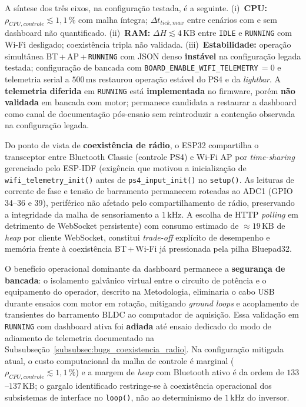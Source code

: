 A síntese dos três eixos, na configuração testada, é a seguinte. (i)~\textbf{CPU:} $\rho_{CPU,controle} \lesssim 1{,}1\,\%$ com malha íntegra; $\Delta t_{tick,max}$ entre cenários com e sem dashboard não quantificado. (ii)~\textbf{RAM:} $\Delta H \lesssim 4\,\text{KB}$ entre \texttt{IDLE} e \texttt{RUNNING} com Wi-Fi desligado; coexistência tripla não validada. (iii)~\textbf{Estabilidade:} operação simultânea BT\,+\,AP\,+\,\texttt{RUNNING} com JSON denso \textbf{instável} na configuração legada testada; configuração de bancada com \texttt{BOARD\_ENABLE\_WIFI\_TELEMETRY}\,$= 0$ e telemetria serial a $500\,\text{ms}$ restaurou operação estável do PS4 e da \textit{lightbar}. A \textbf{telemetria diferida} em \texttt{RUNNING} está \textbf{implementada} no firmware, porém \textbf{não validada} em bancada com motor; permanece candidata a restaurar a dashboard como canal de documentação pós-ensaio sem reintroduzir a contenção observada na configuração legada.

Do ponto de vista de \textbf{coexistência de rádio}, o ESP32 compartilha o transceptor entre Bluetooth Classic (controle PS4) e Wi-Fi AP por \textit{time-sharing} gerenciado pelo ESP-IDF (exigência que motivou a inicialização de \texttt{wifi\_telemetry\_init()} antes de \texttt{ps4\_input\_init()} no \texttt{setup()}. As leituras de corrente de fase e tensão de barramento permanecem roteadas ao ADC1 (GPIO 34--36 e 39), periférico não afetado pelo compartilhamento de rádio, preservando a integridade da malha de sensoriamento a $1\,\text{kHz}$. A escolha de HTTP \textit{polling} em detrimento de WebSocket persistente) com consumo estimado de $\approx 19\,\text{KB}$ de \textit{heap} por cliente WebSocket, constitui \textit{trade-off} explícito de desempenho e memória frente à coexistência BT\,+\,Wi-Fi já pressionada pela pilha Bluepad32.

O benefício operacional dominante da dashboard permanece a \textbf{segurança de bancada}: o isolamento galvânico virtual entre o circuito de potência e o equipamento do operador, descrito na Metodologia, eliminaria o cabo USB durante ensaios com motor em rotação, mitigando \textit{ground loops} e acoplamento de transientes do barramento BLDC ao computador de aquisição. Essa validação em \texttt{RUNNING} com dashboard ativa foi \textbf{adiada} até ensaio dedicado do modo de adiamento de telemetria documentado na Subsubseção~\ref{subsubsec:bugs_coexistencia_radio}. Na configuração mitigada atual, o custo computacional da malha de controle é marginal ($\rho_{CPU,controle} \lesssim 1{,}1\,\%$) e a margem de \textit{heap} com Bluetooth ativo é da ordem de $133$--$137\,\text{KB}$; o gargalo identificado restringe-se à coexistência operacional dos subsistemas de interface no \texttt{loop()}, não ao determinismo de $1\,\text{kHz}$ do inversor.
